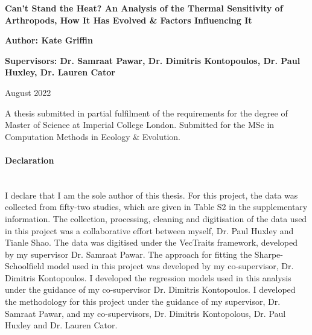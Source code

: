 \documentclass[11pt]{article}
\begin{document}
\begin{titlepage}
   \begin{center}
       \vspace*{5cm}

       \textbf{Can't Stand the Heat? An Analysis of the Thermal Sensitivity of Arthropods, How It Has Evolved \& Factors Influencing It}
       
       \vspace{2cm}
       \textbf{Author: Kate Griffin}
       
       \vspace*{2cm}
       \textbf{Supervisors: Dr. Samraat Pawar, Dr. Dimitris Kontopoulos, Dr. Paul Huxley,  Dr. Lauren Cator}
       
       \vspace{2cm}
       August 2022
            
       \vspace{4cm}
       \small
       A thesis submitted in partial fulfilment of the requirements for the degree of Master of Science at Imperial College London.
       \linebreak
       \small
       Submitted for the MSc in Computation Methods in Ecology \& Evolution.

       \vfill
            
  \end{center}
\end{titlepage}
\clearpage

\vspace{10cm}

\paragraph{Declaration}\mbox{}\\
I declare that I am the sole author of this thesis. For this project, the data was collected from fifty-two studies, which are given in Table S2 in the supplementary information. The collection, processing, cleaning and digitisation of the data used in this project was a collaborative effort between myself, Dr. Paul Huxley and Tianle Shao. The data was digitised under the VecTraits framework, developed by my supervisor Dr. Samraat Pawar. The approach for fitting the Sharpe-Schoolfield model used in this project was developed by my co-supervisor, Dr. Dimitris Kontopoulos. I developed the regression models used in this analysis under the guidance of my co-supervisor Dr. Dimitris Kontopoulos. I developed the methodology for this project under the guidance of my supervisor, Dr. Samraat Pawar, and my co-supervisors, Dr. Dimitris Kontopolous, Dr. Paul Huxley and Dr. Lauren Cator.
\end{document}
